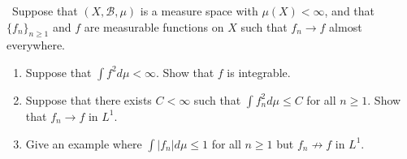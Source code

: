 \documentclass[12pt]{Qual}
\begin{document}
\begin{problem} $\,$
Suppose that $(X,\mathscr{B},\mu)$ is a measure space with $\mu(X)<\infty$, and that $\{f_n\}_{n\ge1}$ and $f$ are measurable functions on $X$ such that $f_n\to f$ almost everywhere.
\begin{enumerate}[label=(\alph*)]
    \item Suppose that $\int f^2d\mu<\infty$. Show that $f$ is integrable.
    \item Suppose that there exists $C<\infty$ such that $\int f_n^2d\mu\le C$ for all $n\ge1$. Show that $f_n\to f$ in $L^1$.
    \item Give an example where $\int|f_n|d\mu\le 1$ for all $n\ge 1$ but $f_n\not\to f$ in $L^1$.
\end{enumerate}
\end{problem}
\end{document}
